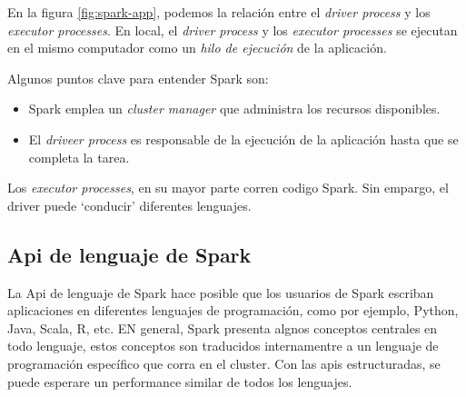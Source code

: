 \documentclass[11pt,oneside]{report}
\theoremstyle{plain}
\theoremstyle{definition}
\begin{document}
En la figura \ref{fig:spark-app}, podemos la relación entre el \emph{driver process} y los \emph{executor processes}. En local, el \emph{driver process} y los \emph{executor processes} se ejecutan en el mismo computador como un \emph{hilo de ejecución} de la aplicación. 

Algunos puntos clave para entender Spark son:
\begin{itemize}
    \item Spark emplea un \emph{cluster manager} que administra los recursos disponibles.
    \item El \emph{driveer process} es responsable de la ejecución de la aplicación hasta que se completa la tarea.
\end{itemize}

Los \emph{executor processes}, en su mayor parte corren codigo Spark. Sin empargo, el driver puede \enquote*{conducir} diferentes lenguajes.

\subsection*{Api de lenguaje de Spark}

La Api de lenguaje de Spark hace posible que los usuarios de Spark escriban aplicaciones en diferentes lenguajes de programación, como por ejemplo, Python, Java, Scala, R, etc. EN general, Spark presenta algnos conceptos centrales en todo lenguaje, estos conceptos son traducidos internamentre a un lenguaje de programación específico que corra en el cluster. Con las apis estructuradas, se puede esperare un performance similar de todos los lenguajes. 
\end{document}
